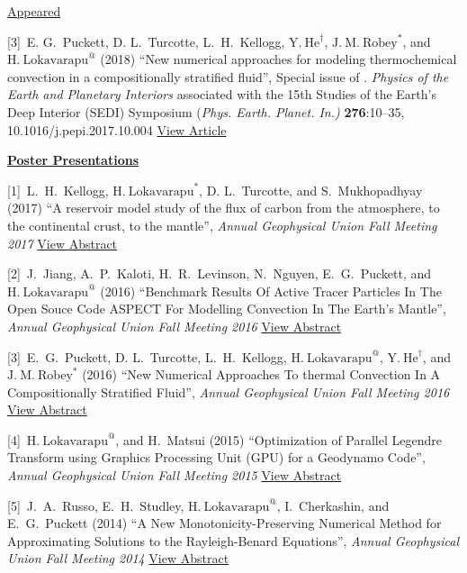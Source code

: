 \documentclass[11pt]{ltxdoc}
\begin{document}
\noindent
\underline{Appeared}

\vskip 06pt

\hangindent 20pt
[3]~E. G.~Puckett, D. L.~Turcotte, L.~H.~Kellogg,  $\mathrm{Y.~He}^{\dagger}$, $\mathrm{J.~M.~Robey}^{*}$, and 
$\mathrm{H.~Lokavarapu}^{@}$ (2018)
``New numerical approaches for modeling thermochemical convection in a compositionally stratified fluid'', 
Special issue of . \textit{Physics of the Earth and Planetary Interiors} associated with the 15th Studies of the Earth's Deep Interior (SEDI) Symposium (\textit{Phys. Earth. Planet. In.)} \textbf{276}:10–35, 10.1016/j.pepi.2017.10.004
\href{https://www.math.ucdavis.edu/~egp/PUBLICATIONS/JOURNAL_ARTICLES/APPEARED/2018/EGP-DLT-YH-HL-JMR-LHK-2018.pdf}{View Article}

\noindent
\textbf{\underline{Poster Presentations}}


\hangindent 20pt
[1]~L.~H.~Kellogg, $\mathrm{H.~Lokavarapu}^{*}$, D. L.~Turcotte, and S.~Mukhopadhyay (2017) 
``A reservoir model study of the flux of carbon from the atmosphere, to the continental crust, to the mantle'', 
\textit{Annual Geophysical Union Fall Meeting 2017}
\href{http://adsabs.harvard.edu/abs/2017AGUFMDI14A..06K}{View Abstract}

\hangindent 20pt
[2]~J.~Jiang, A.~P.~Kaloti, H.~R.~Levinson, N.~Nguyen, E.~G.~Puckett, and $\mathrm{H.~Lokavarapu}^{@}$ (2016) 
``Benchmark Results Of Active Tracer Particles In The Open Souce Code ASPECT For Modelling Convection In The Earth's Mantle'', 
\textit{Annual Geophysical Union Fall Meeting 2016}
\href{http://adsabs.harvard.edu/abs/2016AGUFM.T23C2946J}{View Abstract}

\hangindent 20pt
[3]~E.~G.~Puckett, D. L.~Turcotte, L.~H.~Kellogg, $\mathrm{H.~Lokavarapu}^{@}$,  $\mathrm{Y.~He}^{\dagger}$, and $\mathrm{J.~M.~Robey}^{*}$ (2016) 
``New Numerical Approaches To thermal Convection In A Compositionally Stratified Fluid'', 
\textit{Annual Geophysical Union Fall Meeting 2016}
\href{http://adsabs.harvard.edu/abs/2016AGUFMDI23A2589P}{View Abstract}

\hangindent 20pt
[4]~$\mathrm{H.~Lokavarapu}^{@}$, and H.~Matsui (2015) 
``Optimization of Parallel Legendre Transform using Graphics Processing Unit (GPU) for a Geodynamo Code'', 
\textit{Annual Geophysical Union Fall Meeting 2015}
\href{http://adsabs.harvard.edu/abs/2015AGUFMGP43B1253L}{View Abstract}

\hangindent 20pt
[5]~J.~A.~Russo, E.~H.~Studley, $\mathrm{H.~Lokavarapu}^{@}$, I.~Cherkashin, and E.~G.~Puckett (2014) 
``A New Monotonicity-Preserving Numerical Method for Approximating Solutions to the Rayleigh-Benard Equations'', 
\textit{Annual Geophysical Union Fall Meeting 2014}
\href{http://adsabs.harvard.edu/abs/2014AGUFMDI11A4258R}{View Abstract}
\end{document}
